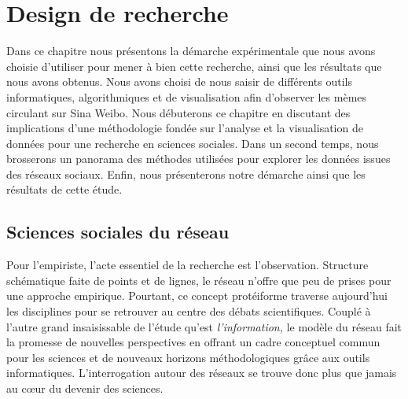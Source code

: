 \chapter{Design de recherche}

Dans ce chapitre nous présentons la démarche expérimentale que nous avons choisie d{\textquoteright}utiliser pour mener à bien cette recherche, ainsi que les résultats que nous avons obtenus. Nous avons choisi de nous saisir de différents outils informatiques, algorithmiques et de visualisation afin d{\textquoteright}observer les mèmes circulant sur Sina Weibo. Nous débuterons ce chapitre en discutant des implications d{\textquoteright}une méthodologie fondée sur l{\textquoteright}analyse et la visualisation de données pour une recherche en sciences sociales. Dans un second temps, nous brosserons un panorama des méthodes utilisées pour explorer les données issues des réseaux sociaux. Enfin, nous présenterons notre démarche ainsi que les résultats de cette étude. 


\section[Sciences sociales du réseau]{Sciences sociales du réseau}
Pour l{\textquoteright}empiriste, l{\textquoteright}acte essentiel de la recherche est l{\textquoteright}observation. Structure schématique faite de points et de lignes, le réseau n{\textquoteright}offre que peu de prises pour une approche empirique. Pourtant, ce concept protéiforme traverse aujourd{\textquoteright}hui les disciplines pour se retrouver au centre des débats scientifiques. Couplé à l{\textquoteright}autre grand insaisissable de l{\textquoteright}étude qu{\textquoteright}est \textit{l{\textquoteright}information, }le modèle du réseau fait la promesse de nouvelles perspectives en offrant un cadre conceptuel commun pour les sciences et de nouveaux horizons méthodologiques gr\^ace aux outils informatiques. L{\textquoteright}interrogation autour des réseaux se trouve donc plus que jamais au c{\oe}ur du devenir des sciences. 


